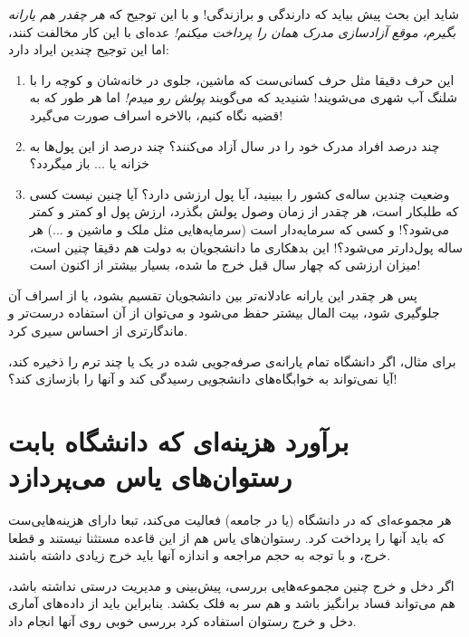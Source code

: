 \documentclass{article}
\begin{document}
		شاید این بحث پیش‌ بیاید که دارندگی و برازندگی! و با این توجیح که \textit{هر چقدر هم یارانه بگیرم، موقع آزادسازی مدرک همان را پرداخت میکنم!} عده‌ای با این کار مخالفت کنند، اما این توجیح چندین ایراد دارد:
		\begin{enumerate}
			\item 
			این حرف دقیقا مثل حرف کسانی‌ست که ماشین، جلوی در خانه‌‌شان و کوچه را با شلنگ آب شهری می‌شویند! شنیدید که می‌گویند \textit{پولش رو میدم!} اما هر طور که به قضیه نگاه کنیم، بالاخره اسراف صورت می‌گیرد!
			\item 
			چند درصد افراد مدرک خود را در سال آزاد می‌کنند؟ چند درصد از این پول‌ها به خزانه یا ... باز میگردد؟
			\item 
			وضعیت چندین ساله‌ی کشور را ببینید، آیا پول ارزشی دارد؟ آیا چنین نیست کسی که طلبکار است، هر چقدر از زمان وصول پولش بگذرد، ارزش پول او کمتر و کمتر می‌شود؟! و کسی که سرمایه‌دار است (سرمایه‌هایی مثل ملک و ماشین و ...) هر ساله پول‌دارتر می‌شود؟!
			این بدهکاری ما دانشجویان به دولت هم دقیقا چنین است، میزان ارزشی که چهار سال قبل خرج ما شده، بسیار بیشتر از اکنون است!
		\end{enumerate}
	پس هر چقدر این یارانه عادلانه‌تر بین دانشجویان تقسیم بشود، یا از اسراف آن جلوگیری شود، بیت المال بیشتر حفظ می‌شود و می‌توان از آن استفاده درست‌تر و ماندگارتری از احساس سیری کرد.
	
	برای مثال، اگر دانشگاه تمام یارانه‌ی صرفه‌جویی شده در یک یا چند ترم را ذخیره کند، آیا نمی‌تواند به خوابگاه‌های دانشجویی رسیدگی کند و آنها را بازسازی کند؟!
	
	\section{برآورد هزینه‌ای که دانشگاه بابت رستوان‌های یاس می‌پردازد}
		هر مجموعه‌ای که در دانشگاه (یا در جامعه) فعالیت می‌کند، تبعا دارای هزینه‌هایی‌ست که باید آنها را پرداخت کرد. رستوان‌های یاس هم از این قاعده مستثنا نیستند و قطعا خرج، و با توجه به حجم مراجعه و اندازه‌ آنها باید خرج زیادی داشته باشند.
		
		اگر دخل و خرج چنین مجموعه‌هایی بررسی، پیش‌بینی و مدیریت درستی نداشته باشد، هم می‌تواند فساد برانگیز باشد و هم سر به فلک بکشد. بنابراین باید از داده‌های آماری دخل و خرج رستوان استفاده کرد بررسی خوبی روی آنها انجام داد.
\end{document}

